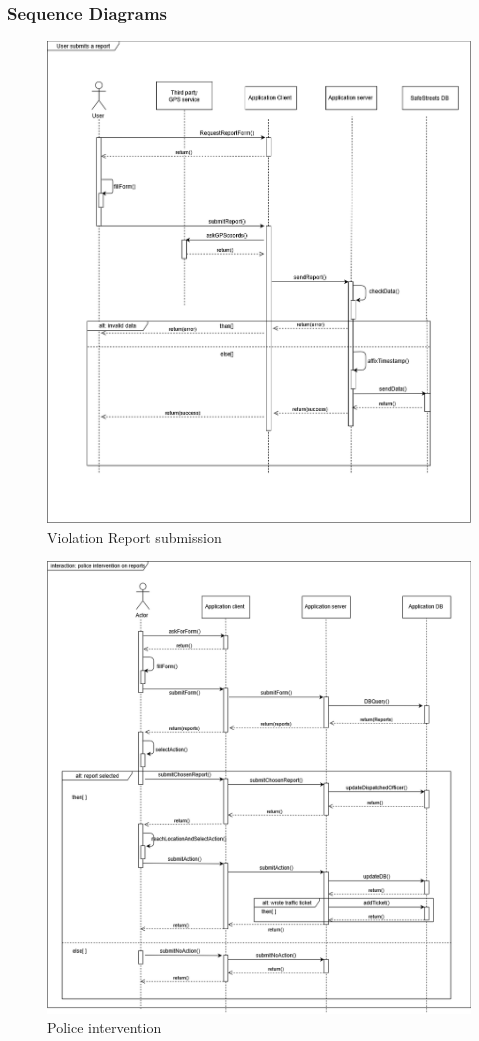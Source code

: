 	\subsubsection{Sequence Diagrams}
	\begin{figure}[h!]
		\includegraphics[width=\textwidth]{Images/ReportSubmitSequenceDiagram-0-2}
		\caption{Violation Report submission}
	\end{figure}
	\newpage
	\begin{figure}[h!]
		\includegraphics[width=\textwidth]{Images/PoliceIntervention}
		\caption{Police intervention}
	\end{figure}
